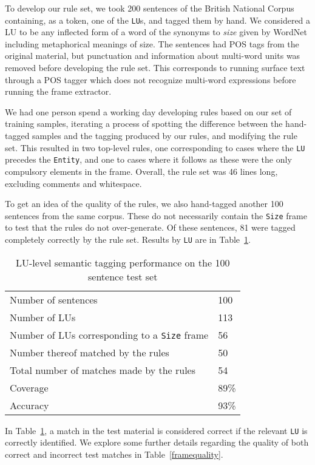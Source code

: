 \documentclass{llncs}
\begin{document}
To develop our rule set, we took 200 sentences of the British National
Corpus containing, as a token, one of the \verb+LU+s, and tagged them by hand.
We considered a LU to be any inflected form of a word of the synonyms to \emph{size} given by WordNet
including metaphorical meanings of size.
The sentences had POS tags from the original material, but punctuation
and information about multi-word units was removed before developing
the rule set. This corresponds to running surface text through a POS tagger which does not recognize multi-word expressions before
running the frame extractor.

We had one person spend a working day developing rules based on our set of training samples, iterating a process
of spotting the difference between the hand-tagged samples and the
tagging produced by our rules, and modifying the rule set. This  resulted
in two top-level rules, one corresponding to cases where the \verb+LU+ precedes
the \verb+Entity+, and one to cases where it follows as these were the only
compulsory elements in the frame. Overall, the rule set was 46 lines long, excluding comments and whitespace.

To get an idea of the quality of the rules, we also hand-tagged another 100 sentences from the same corpus. 
These do not necessarily contain the \verb+Size+ frame to test that the rules do not over-generate.
Of these sentences, 81 were tagged completely correctly by the rule set. Results by \verb+LU+ are in
Table~\ref{luperf}.

\begin{table}[h]
  \centering
  \begin{tabular}{l | l}
    \hline
    Number of sentences & 100 \\
    Number of LUs & 113 \\
    Number of LUs corresponding to a \verb+Size+ frame & 56 \\ %
    Number thereof matched by the rules & 50 \\
    Total number of matches made by the rules & 54 \\
    \hline
    Coverage & 89\% \\
    Accuracy & 93\% \\
    \hline
  \end{tabular}
  \caption{LU-level semantic tagging performance on the 100 sentence test set}
  \label{luperf}
\end{table}

In Table~\ref{luperf}, a match in the test material is considered correct if the relevant \verb+LU+
is correctly identified. We explore some further details regarding the quality of both
correct and incorrect test matches in Table~\ref{framequality}.
\end{document}
